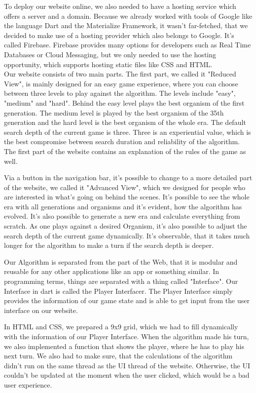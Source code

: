 To deploy our website online, we also needed to have a hosting service which offers a server and a domain. Because we already worked with tools of Google like the language Dart and the Materialize Framework, it wasn't far-fetched, that we decided to make use of a hosting provider which also belongs to Google. It's called Firebase. Firebase provides many options for developers such as Real Time Databases or Cloud Messaging, but we only needed to use the hosting opportunity, which supports hosting static files like CSS and HTML.\\

Our website consists of two main parts. The first part, we called it "Reduced View", is mainly designed for an easy game experience, where you can choose between three levels to play against the algorithm. The levels include "easy", "medium" and "hard". Behind the easy level plays the best organism of the first generation. 
The medium level is played by the best organism of the 35th %
generation and the hard level is the best organism of the whole era. The default search depth of the current game is three. Three is an experiential value, which is the best compromise between search duration and reliability of the algorithm.
The first part of the website contains an explanation of the rules of the game as well.

Via a button in the navigation bar, it's possible to change to a more detailed  part of the website, we called it "Advanced View", which we designed for people who are interested in what's going on behind the scenes. It's possible to see the whole era with all generations and organisms and it's evident, how the algorithm has evolved. It's also possible to generate a new era and calculate everything from scratch. As one plays against a desired Organism, it's also possible to adjust the search depth of the current game dynamically. It's observable, that it takes much longer for the algorithm to make a turn if the search depth is deeper. %

Our Algorithm is separated from the part of the Web, that it is modular and reusable for any other applications like an app or something similar. In programming terms, things are separated with a thing called "Interface". Our Interface in dart is called the Player Interfacer. The Player Interface simply provides the information of our game state and is able to get input from the user interface on our website.

In HTML and CSS, we prepared a 9x9 grid, which we had to fill dynamically with the information of our Player Interface. When the algorithm made his turn, we also implemented a function that shows the player, where he has to play his next turn. 
We also had to make sure, that the calculations of the algorithm didn't run on the same thread as the UI thread of the website. Otherwise, the UI couldn't be updated at the moment when the user clicked, which would be a bad user experience.


